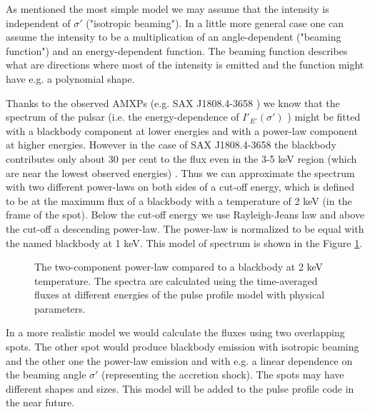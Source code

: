 \documentclass{wihuri}
\def\Dop{\delta}
\begin{document}

As mentioned the most simple model we may assume that the intensity is independent of $\sigma'$ ("isotropic beaming"). In a little more general case one can assume the intensity to be a multiplication of an angle-dependent ("beaming function") and an energy-dependent function. The beaming function describes what are directions where most of the intensity is emitted and the function might have e.g. a polynomial shape.  


Thanks to the observed AMXPs (e.g. SAX J1808.4-3658 \cite{poutagierlinskisax}) we know that the spectrum of the pulsar (i.e. the energy-dependence of $I'_{E'}(\sigma')$ ) might be fitted with a blackbody component at lower energies and with a power-law component at higher energies. However in the case of SAX J1808.4-3658 the blackbody contributes only about 30 per cent to the flux even in the 3-5 keV region (which are near the lowest observed energies) \cite{poutagierlinskisax}. Thus we can approximate the spectrum with two different power-laws on both sides of a cut-off energy, which is defined to be at the maximum flux of a blackbody with a temperature of 2 keV (in the frame of the spot). Below the cut-off energy we use Rayleigh-Jeans law and above the cut-off a descending power-law. The power-law is normalized to be equal with the named blackbody at 1 keV. This model of spectrum is shown in the Figure \ref{fig:spectrum}.


\begin{figure}
\centerline{}
\caption{The two-component power-law compared to a blackbody at 2 keV temperature. The spectra are calculated using the time-averaged fluxes at different energies of the pulse profile model with physical parameters. 
\label{fig:spectrum}}
\end{figure}


In a more realistic model we would calculate the fluxes using two overlapping spots. The other spot would produce blackbody emission with isotropic beaming and the other one the power-law emission and with e.g. a linear dependence on the beaming angle $\sigma'$ (representing the accretion shock). The spots may have different shapes and sizes. This model will be added to the pulse profile code in the near future.
\end{document}
